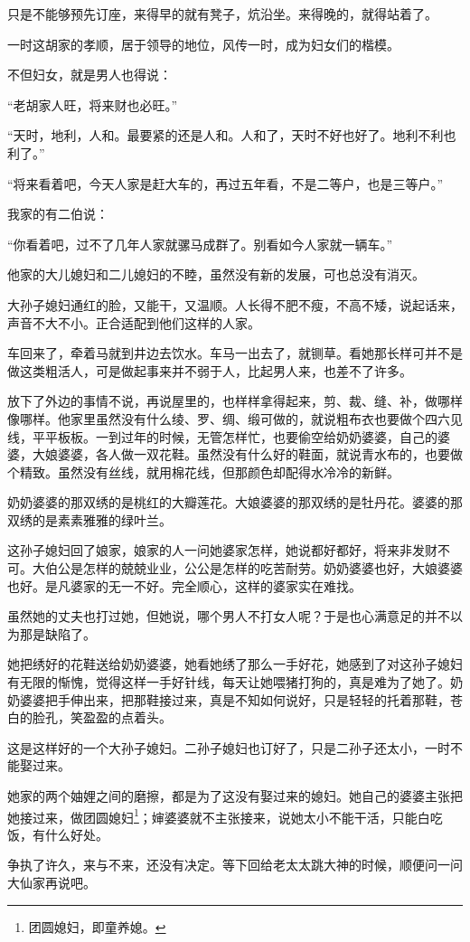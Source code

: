 \par 只是不能够预先订座，来得早的就有凳子，炕沿坐。来得晚的，就得站着了。
\par 一时这胡家的孝顺，居于领导的地位，风传一时，成为妇女们的楷模。
\par 不但妇女，就是男人也得说：
\par “老胡家人旺，将来财也必旺。”
\par “天时，地利，人和。最要紧的还是人和。人和了，天时不好也好了。地利不利也利了。”
\par “将来看着吧，今天人家是赶大车的，再过五年看，不是二等户，也是三等户。”
\par 我家的有二伯说：
\par “你看着吧，过不了几年人家就骡马成群了。别看如今人家就一辆车。”
\par 他家的大儿媳妇和二儿媳妇的不睦，虽然没有新的发展，可也总没有消灭。
\par 大孙子媳妇通红的脸，又能干，又温顺。人长得不肥不瘦，不高不矮，说起话来，声音不大不小。正合适配到他们这样的人家。
\par 车回来了，牵着马就到井边去饮水。车马一出去了，就铡草。看她那长样可并不是做这类粗活人，可是做起事来并不弱于人，比起男人来，也差不了许多。
\par 放下了外边的事情不说，再说屋里的，也样样拿得起来，剪、裁、缝、补，做哪样像哪样。他家里虽然没有什么绫、罗、绸、缎可做的，就说粗布衣也要做个四六见线，平平板板。一到过年的时候，无管怎样忙，也要偷空给奶奶婆婆，自己的婆婆，大娘婆婆，各人做一双花鞋。虽然没有什么好的鞋面，就说青水布的，也要做个精致。虽然没有丝线，就用棉花线，但那颜色却配得水冷冷的新鲜。
\par 奶奶婆婆的那双绣的是桃红的大瓣莲花。大娘婆婆的那双绣的是牡丹花。婆婆的那双绣的是素素雅雅的绿叶兰。
\par 这孙子媳妇回了娘家，娘家的人一问她婆家怎样，她说都好都好，将来非发财不可。大伯公是怎样的兢兢业业，公公是怎样的吃苦耐劳。奶奶婆婆也好，大娘婆婆也好。是凡婆家的无一不好。完全顺心，这样的婆家实在难找。
\par 虽然她的丈夫也打过她，但她说，哪个男人不打女人呢？于是也心满意足的并不以为那是缺陷了。
\par 她把绣好的花鞋送给奶奶婆婆，她看她绣了那么一手好花，她感到了对这孙子媳妇有无限的惭愧，觉得这样一手好针线，每天让她喂猪打狗的，真是难为了她了。奶奶婆婆把手伸出来，把那鞋接过来，真是不知如何说好，只是轻轻的托着那鞋，苍白的脸孔，笑盈盈的点着头。
\par 这是这样好的一个大孙子媳妇。二孙子媳妇也订好了，只是二孙子还太小，一时不能娶过来。
\par 她家的两个妯娌之间的磨擦，都是为了这没有娶过来的媳妇。她自己的婆婆主张把她接过来，做团圆媳妇\footnote{团圆媳妇，即童养媳。}；婶婆婆就不主张接来，说她太小不能干活，只能白吃饭，有什么好处。
\par 争执了许久，来与不来，还没有决定。等下回给老太太跳大神的时候，顺便问一问大仙家再说吧。
